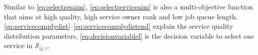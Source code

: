 \begin{asparaenum}
Similar to \autoref{eq:selectresaim}, \autoref{eq:selectserviceaim} is also a multi-objective function that aims at high quality, high service owner rank and low job queue length. \autoref{eq:servicecomplydist}--\ref{eq:servicecomplydistend} explain the service quality distribution parameters, \autoref{eq:decisionvariablel} is the decision variable to select one service in $\mathcal{S}_{ij,\tau}$.


\end{asparaenum}
